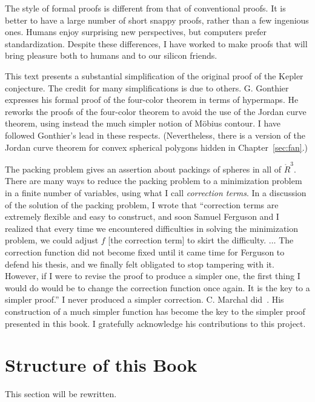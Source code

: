 The style of formal proofs is different from that of
conventional proofs.  It is better to have a large number of short
snappy proofs, rather than a few ingenious ones.  Humans enjoy
surprising new perspectives, but computers prefer standardization.
Despite these differences, I have worked to make proofs that
will bring pleasure both to humans and to our silicon friends.

This text presents a substantial simplification of the original proof of the Kepler conjecture.  The credit for many simplifications is due to others.  G. Gonthier expresses his formal proof of the four-color theorem in terms of hypermaps.  He reworks the proofs of the four-color theorem to avoid the use of the Jordan curve theorem, using instead the much simpler notion of M\"obius contour.  I have followed Gonthier's lead in these respects.  (Nevertheless, there is a version of the Jordan curve theorem for convex spherical polygons hidden in Chapter~\ref{sec:fan}.)  

The packing problem gives an assertion about packings of spheres in all of $\ring{R}^3$.  There are many ways to reduce the packing problem to a minimization problem in a finite number of variables, using what I call {\it correction terms}.  In a discussion of the solution of the packing problem, I wrote that ``correction terms are extremely flexible and easy to construct, and soon Samuel Ferguson and I realized that every time we encountered difficulties in solving the minimization problem, we could adjust $f$ [the correction term] to skirt the difficulty. $\ldots$  The correction function did not become fixed until it came time for Ferguson to defend his thesis, and we finally felt obligated to stop tampering with it.  However, if I were to revise the proof to produce a simpler one, the first thing I would do would be to change the correction function once again.  It is the key to a simpler proof.''  I never produced a simpler correction.  C. Marchal did~\cite{XX}.  His construction of a much simpler function has become the key to the simpler proof presented in this book.  I gratefully acknowledge his contributions to this project.


\section{Structure of this Book}

\begin{note}%
This section will be rewritten.
\end{note}

